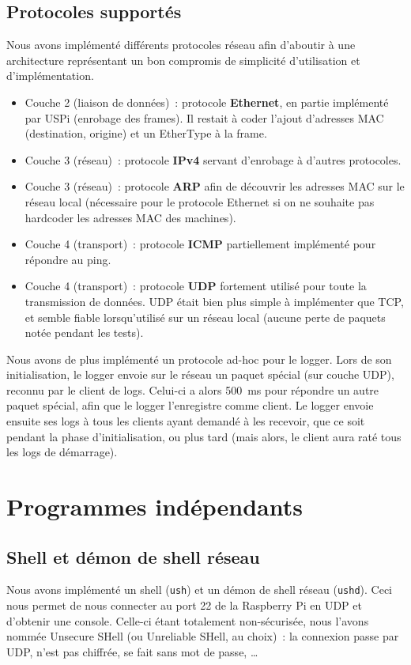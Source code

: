 \documentclass[11pt,a4paper]{article}
\newcommand{\fname}[1]{\texttt{#1}} %
\begin{document}
\subsection{Protocoles supportés}
Nous avons implémenté différents protocoles réseau afin d'aboutir à une
architecture représentant un bon compromis de simplicité d'utilisation
et d'implémentation.
\begin{itemize}
	\item Couche 2 (liaison de données)~: protocole \textbf{Ethernet}, en partie
		implémenté par USPi (enrobage des frames). Il restait à coder
		l'ajout d'adresses MAC (destination, origine) et un EtherType à la
		frame.
	\item Couche 3 (réseau)~: protocole \textbf{IPv4} servant d'enrobage à
		d'autres protocoles.
	\item Couche 3 (réseau)~: protocole \textbf{ARP} afin de découvrir les
		adresses MAC sur le réseau local (nécessaire pour le protocole
		Ethernet si on ne souhaite pas hardcoder les adresses MAC des
		machines).
	\item Couche 4 (transport)~: protocole \textbf{ICMP} partiellement
		implémenté pour répondre au ping.
	\item Couche 4 (transport)~: protocole \textbf{UDP} fortement utilisé
		pour toute la transmission de données. UDP était bien plus simple à
		implémenter que TCP, et semble fiable lorsqu'utilisé sur un réseau
		local (aucune perte de paquets notée pendant les tests).
\end{itemize}

Nous avons de plus implémenté un protocole ad-hoc pour le logger.
Lors de son initialisation, le logger envoie sur le réseau un paquet spécial
(sur couche UDP), reconnu par le client de logs. Celui-ci a alors 500\ ms pour
répondre un autre paquet spécial, afin que le logger l'enregistre comme
client. Le logger envoie ensuite ses logs à tous les clients ayant demandé à
les recevoir, que ce soit pendant la phase d'initialisation, ou plus tard
(mais alors, le client aura raté tous les logs de démarrage).

\section{Programmes indépendants}

\subsection{Shell et démon de shell réseau}
Nous avons implémenté un shell (\fname{ush}) et un démon de shell réseau
(\fname{ushd}). Ceci nous permet de nous connecter au port 22 de la
Raspberry Pi en UDP et d'obtenir une console. Celle-ci étant totalement
non-sécurisée, nous l'avons nommée Unsecure SHell (ou Unreliable SHell,
au choix)~: la connexion passe par UDP, n'est pas chiffrée, se fait sans mot
de passe, \ldots
\end{document}
